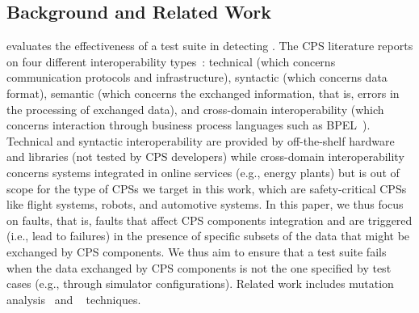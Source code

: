 
\subsection{Background and Related Work}
\label{sec:background}

 evaluates the effectiveness of a test suite in detecting . The CPS literature reports on four different interoperability types~\cite{Givehchi:2017}: technical (which concerns communication protocols and  infrastructure), syntactic (which concerns data format), semantic (which concerns the exchanged information, that is, errors in the processing of exchanged data), and cross-domain interoperability (which concerns interaction through business process languages such as BPEL~\cite{BPEL}).
Technical and syntactic interoperability are provided by off-the-shelf hardware and libraries
(not tested by CPS developers) 
 while cross-domain interoperability concerns systems integrated in online services (e.g., energy plants) but is out of scope for the type of CPSs we target in this work, which are safety-critical CPSs like flight systems, robots, and automotive systems. In this paper, we thus focus on  faults,
 that is, faults that affect CPS components integration and are triggered (i.e., lead to failures) in the presence of specific subsets of the data that might be exchanged by CPS components. We thus aim to ensure that a test suite fails when the data exchanged by CPS components is not the one specified by test cases (e.g., through simulator configurations).
Related work includes mutation analysis~\cite{jia2010analysis,papadakis2019mutation} and ~\cite{natella2016assessing} techniques.



